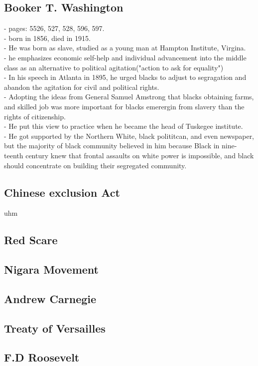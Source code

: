 \documentclass{article}
\begin{document}
\subsection{ Booker T. Washington}
- pages: 5526, 527, 528, 596, 597.\\
- born in 1856, died in 1915.\\
- He was born as slave, studied as a young man at Hampton Institute, Virgina.\\
- he emphasizes economic self-help and individual advancement into the middle class as an alternative to political agitation("action to ask for equality")\\
- In his speech in Atlanta in 1895, he urged blacks to adjust to segragation and abandon the agitation for civil and political rights.\\
-  Adopting the ideas from General Samuel Amstrong that blacks obtaining farms, and skilled job was more important for blacks emerergin from slavery than the rights of citizenship.\\
- He put this view to practice when he became the head of Tuskegee institute.\\
- He got supported by the Northern White, black polititcan, and even newspaper, but the majority of black community believed in him because Black in nine-teenth century knew that frontal assaults on white power is impossible, and black should concentrate on building their segregated community.\\

\subsection{ Chinese exclusion Act}
uhm
\subsection{ Red Scare}
\subsection{ Nigara Movement}
\subsection{ Andrew Carnegie}
\subsection{ Treaty of Versailles}
\subsection{ F.D Roosevelt}
\end{document}
